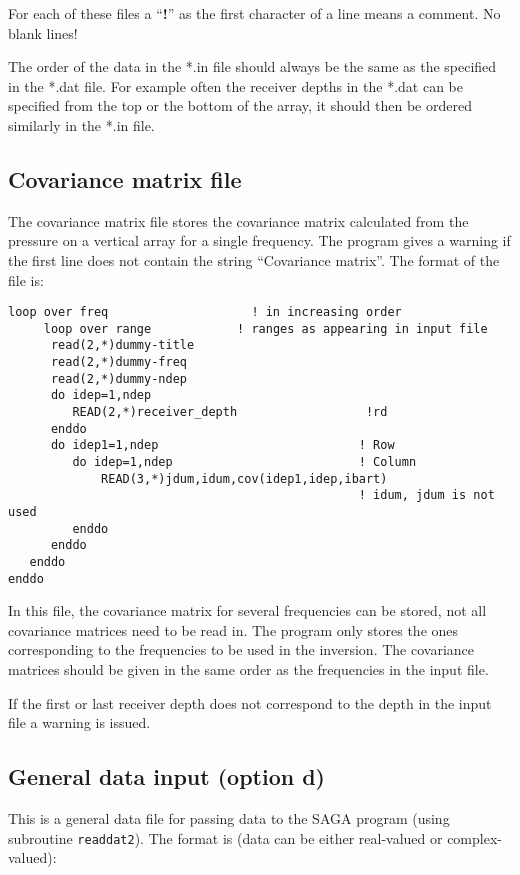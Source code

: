 \documentclass{saclantc}
\begin{document}
For each of these files a ``{\bf !}'' as the first character of a line
means a comment.  No blank lines!


The order of the data in the *.in file 
should always be the same as the specified in the *.dat file. For
example often the receiver depths in the *.dat can be specified from
the top or the bottom of the array, it should then be ordered
similarly in the *.in file.

\subsection{Covariance matrix file}
\label{se:opt_c}
The   covariance matrix file stores  the covariance matrix calculated from
the pressure on a vertical array for a single frequency. The program gives a 
warning if the first line does not contain the string ``Covariance matrix''.
The format of the file is:

\small
\begin{verbatim}
loop over freq                    ! in increasing order
     loop over range            ! ranges as appearing in input file
      read(2,*)dummy-title
      read(2,*)dummy-freq 
      read(2,*)dummy-ndep
      do idep=1,ndep
         READ(2,*)receiver_depth                  !rd
      enddo
      do idep1=1,ndep                            ! Row
         do idep=1,ndep                          ! Column
             READ(3,*)jdum,idum,cov(idep1,idep,ibart)    
                                                 ! idum, jdum is not used 
         enddo
      enddo
   enddo
enddo
\end{verbatim}
\normalsize

In this file, the covariance matrix for several frequencies can be stored,
not all covariance matrices need to be read in. The program only
stores  the ones corresponding to the frequencies to be used in the inversion.
The covariance matrices should be given in the same order as the 
frequencies in the input file.

If the first or last receiver depth does not correspond to the
depth in the input file a warning is issued.

\subsection{General data input (option d)}
\label{se:opt_d}
This is a  general data file for passing data to the  {\sf SAGA} program 
(using
subroutine {\tt readdat2}). 
The format is (data can be  either real-valued or complex-valued):
\end{document}

